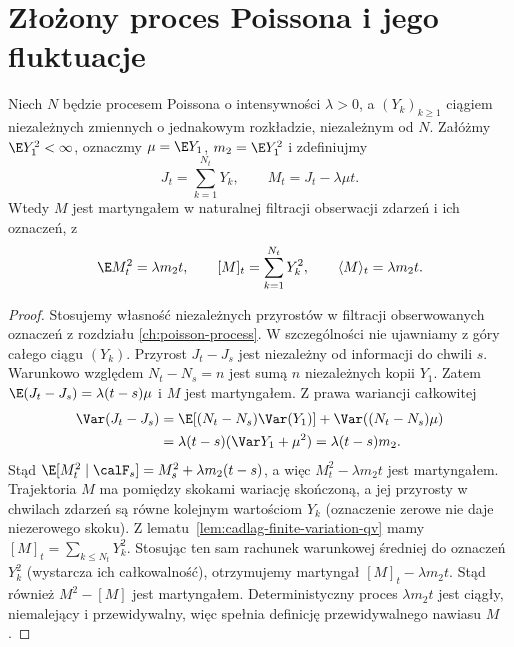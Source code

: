 \section{Złożony proces Poissona i jego fluktuacje}
\begin{twierdzenie}
\label{thm:compound-poisson-brackets}
Niech $N$ będzie procesem Poissona o intensywności
$\lambda>0$, a $(Y_k)_{k\ge1}$ ciągiem niezależnych
zmiennych o jednakowym rozkładzie, niezależnym od $N$.
Załóżmy $\E Y_1^2<\infty$, oznaczmy
$\mu=\E Y_1$, $m_2=\E Y_1^2$ i zdefiniujmy
\[
J_t=\sum_{k=1}^{N_t}Y_k,\qquad
M_t=J_t-\lambda\mu t.
\]
Wtedy $M$ jest martyngałem w naturalnej filtracji
obserwacji zdarzeń i ich oznaczeń, z
\[
\E M_t^2=\lambda m_2t,\qquad
[M]_t=\sum_{k=1}^{N_t}Y_k^2,\qquad
\langle M\rangle_t=\lambda m_2t.
\]
\end{twierdzenie}
\begin{proof}
Stosujemy własność niezależnych przyrostów
w filtracji obserwowanych oznaczeń z rozdziału
\ref{ch:poisson-process}. W szczególności nie
ujawniamy z góry całego ciągu $(Y_k)$.
Przyrost $J_t-J_s$ jest niezależny od informacji
do chwili $s$. Warunkowo względem $N_t-N_s=n$ jest sumą
$n$ niezależnych kopii $Y_1$. Zatem
$\E(J_t-J_s)=\lambda(t-s)\mu$ i $M$ jest martyngałem.
Z prawa wariancji całkowitej
\[
\begin{aligned}
\Var(J_t-J_s)
&=\E[(N_t-N_s)\Var(Y_1)]
 +\Var((N_t-N_s)\mu)\\
&=\lambda(t-s)(\Var Y_1+\mu^2)
=\lambda(t-s)m_2.
\end{aligned}
\]
Stąd $\E[M_t^2\mid\calF_s]
=M_s^2+\lambda m_2(t-s)$, a więc
$M_t^2-\lambda m_2t$ jest martyngałem.
Trajektoria $M$ ma pomiędzy skokami wariację skończoną,
a jej przyrosty w chwilach zdarzeń są równe
kolejnym wartościom $Y_k$ (oznaczenie zerowe
nie daje niezerowego skoku).
Z lematu~\ref{lem:cadlag-finite-variation-qv}
mamy $[M]_t=\sum_{k\le N_t}Y_k^2$.
Stosując ten sam rachunek warunkowej średniej
do oznaczeń $Y_k^2$ (wystarcza ich całkowalność),
otrzymujemy martyngał $[M]_t-\lambda m_2t$.
Stąd również $M^2-[M]$ jest martyngałem.
Deterministyczny proces $\lambda m_2t$ jest
ciągły, niemalejący i przewidywalny, więc spełnia
definicję przewidywalnego nawiasu $M$.
\end{proof}

